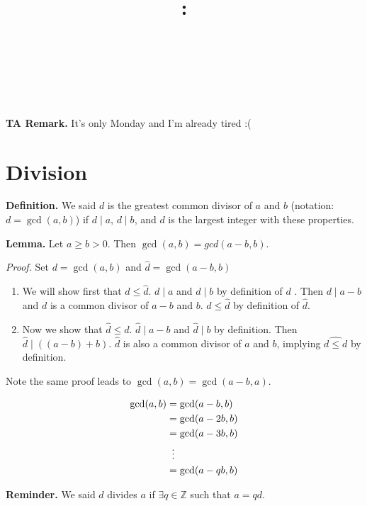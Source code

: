 \documentclass{article}
\title{
    \vspace{2in}
    \textbf{\lectClass:\\ \lectTitle}\\
    \vspace{0.1in}\large{\textit{\lectClassInstructor\ \lectSection}}
    \vspace{3in}
    \author{\textbf{\lectAuthorName}}
    \date{}
}
\begin{document}
\maketitle
\pagebreak

\textbf{TA Remark.} It's only Monday and I'm already tired :(

\section*{Division}
    \textbf{Definition. } We said $d$ is the greatest common divisor of $a$ and $b$ (notation: $d = \gcd(a, b)$) if $d \mid a$, $d \mid b$, and $d$ is the largest integer with these properties.
    
    \vspace{1.5mm}
    \textbf{Lemma.} Let $a \ge b > 0$. Then $\gcd(a, b) = gcd(a - b, b)$.
    
    \vspace{1.5mm}
    \textit{Proof. } Set $d = \gcd(a, b)$ and $\hat{d} = \gcd(a - b, b)$
    \begin{enumerate}[label = \arabic*.]
        \item We will show first that $d \le \hat{d}$. $d \mid a$ and $d \mid b$ by definition of $d$ . Then $d \mid a - b$ and $d$ is a common divisor of $a - b$ and $b$. $d \le \hat{d}$ by definition of $\hat{d}$.
        \item Now we show that $\hat{d} \le d$. $\hat{d} \mid a - b$ and $\hat{d} \mid b$ by definition. Then $\hat{d} \mid ((a - b )+ b)$. $\hat{d}$ is also a common divisor of $a$ and $b$, implying $\hat{d \le d}$ by definition.
    \end{enumerate}
    Note the same proof leads to $\gcd(a, b) = \gcd(a - b, a)$.
    
    
    $$\begin{aligned}[t]
        \gcd(a, b) &= \gcd(a - b, b) \\
        &= \gcd(a - 2b, b) \\
        &= \gcd(a - 3b, b) \\
        &\vdotswithin{ = } \\
        &= \gcd(a - qb, b)
    \end{aligned}$$
    
    \textbf{Reminder.} We said $d$ divides $a$ if $\exists q \in \mathbb{Z}$ such that $a = qd$. 
    
\end{document}
